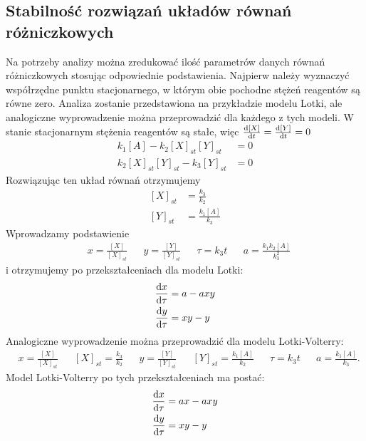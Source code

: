 \documentclass[10pt, a4paper, twoside, onecolumn]{article}
\numberwithin{equation}{section}
\begin{document}
	\subsection{Stabilność rozwiązań układów równań różniczkowych}
	Na potrzeby analizy można zredukować ilość parametrów danych równań różniczkowych stosując odpowiednie podstawienia. Najpierw należy wyznaczyć współrzędne punktu stacjonarnego, w którym obie pochodne stężeń reagentów są równe zero. Analiza zostanie przedstawiona na przykładzie modelu Lotki, ale analogiczne wyprowadzenie można przeprowadzić dla każdego z tych modeli. W stanie stacjonarnym stężenia reagentów są stałe, więc \(\dv{[X]}{t}=\dv{[Y]}{t}=0\)
	\begin{equation}\label{lotka_pods}
	\begin{split}
		k_{1}[A]-k_{2}[X]_{st}[Y]_{st} &= 0 \\
		k_{2}[X]_{st}[Y]_{st}-k_{3}[Y]_{st} &= 0
	\end{split}
	\end{equation}
	Rozwiązując ten układ równań otrzymujemy
	\begin{equation}\label{lotka_stac}
	\begin{split}
		[X]_{st} &= \frac{k_{3}}{k_{2}} \\
		[Y]_{st} &= \frac{k_{1}[A]}{k_{3}}
	\end{split}
	\end{equation}
	Wprowadzamy podstawienie
	\begin{align*}
		& x=\frac{[X]}{[X]_{st}} && y=\frac{[Y]}{[Y]_{st}} && \tau=k_{3}t && a=\frac{k_{1}k_{2}[A]}{k_{3}^{2}}
	\end{align*}
	i otrzymujemy po przekształceniach dla modelu Lotki:
	\begin{equation}\label{lotka_prosty}
	\begin{split}
		\dv{x}{\tau} &= a-axy \\
		\dv{y}{\tau} &= xy-y
	\end{split}
	\end{equation}
	Analogiczne wyprowadzenie można przeprowadzić dla modelu Lotki-Volterry:
	\begin{align}\label{lotka_volterra_stac}
		& x=\frac{[X]}{[X]_{st}} && [X]_{st} = \frac{k_{3}}{k_{2}} && y=\frac{[Y]}{[Y]_{st}} && [Y]_{st} = \frac{k_{1}[A]}{k_{2}} && \tau=k_{3}t && a=\frac{k_{1}[A]}{k_{3}}.
	\end{align}
	Model Lotki-Volterry po tych przekształceniach ma postać: 
	\begin{equation}\label{lotka_volterra_prosty}
	\begin{split}
		\dv{x}{\tau} &= ax-axy \\
		\dv{y}{\tau} &= xy-y
	\end{split}
	\end{equation}
\end{document}
